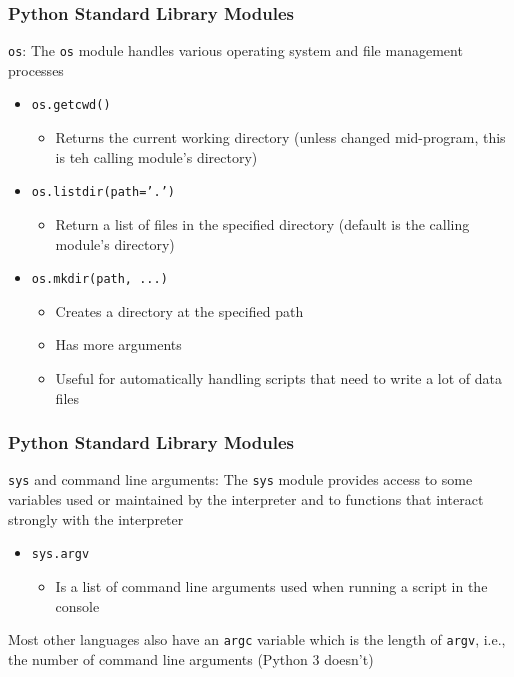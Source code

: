 \documentclass{beamer}
\newcommand{\code}[1]{\texttt{#1}}
\begin{document}
\begin{frame}	
	\frametitle{Python Standard Library Modules}
	
	\begin{block}{\code{os}:}
		The \code{os} module handles various operating system and file management processes
		\begin{itemize}
			\item \code{os.getcwd()}
			\begin{itemize}
				\item Returns the current working directory (unless changed mid-program, this is teh calling module's directory)
			\end{itemize}
			\item \code{os.listdir(path='.')}
			\begin{itemize}
				\item Return a list of files in the specified directory (default is the calling module's directory)
			\end{itemize}
			\item \code{os.mkdir(path, ...)}
			\begin{itemize}
				\item Creates a directory at the specified path
				\item Has more arguments
				\item Useful for automatically handling scripts that need to write a lot of data files 
			\end{itemize}
		\end{itemize}
	\end{block}
	
\end{frame}

\begin{frame}	
	\frametitle{Python Standard Library Modules}
	
	\begin{block}{\code{sys} and command line arguments:}
		The \code{sys} module provides access to some variables used or maintained by the interpreter and to functions that interact strongly with the interpreter 
		\begin{itemize}
			\item \code{sys.argv}
			\begin{itemize}
				\item Is a list of command line arguments used when running a script in the console
			\end{itemize}
		\end{itemize}
		Most other languages also have an \code{argc} variable which is the length of \code{argv}, i.e., the number of command line arguments (Python 3 doesn't)
	\end{block}
	
\end{frame}
\end{document}
